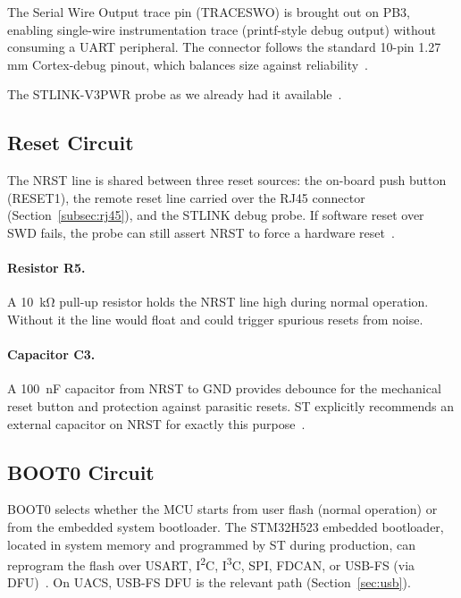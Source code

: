 The Serial Wire Output trace pin (TRACESWO) is brought out on PB3, enabling single-wire
instrumentation trace (printf-style debug output) without consuming a UART peripheral.
The connector follows the standard 10-pin 1.27\,mm Cortex-debug pinout, which balances
size against reliability~\cite{ref13}.

The STLINK-V3PWR probe as we already had it available~\cite{ref4}.

\subsection{Reset Circuit}
\label{subsec:reset}

The NRST line is shared between three reset sources: the on-board push button (RESET1),
the remote reset line carried over the RJ45 connector
(Section~\ref{subsec:rj45}), and the STLINK debug probe. If software reset over SWD fails, the probe can still assert NRST to force a hardware reset~\cite{ref13}.

\paragraph{Resistor R5.}
A \SI{10}{\kilo\ohm} pull-up resistor holds the NRST line high during normal operation.
Without it the line would float and could trigger spurious resets from noise.

\paragraph{Capacitor C3.}
A \SI{100}{\nano\farad} capacitor from NRST to GND provides debounce for the mechanical
reset button and protection against parasitic resets. ST explicitly recommends an external
capacitor on NRST for exactly this purpose~\cite{ref1}.

\subsection{BOOT0 Circuit}
\label{subsec:boot0}

BOOT0 selects whether the MCU starts from user flash (normal operation) or from the
embedded system bootloader. The STM32H523 embedded bootloader, located in system memory
and programmed by ST during production, can reprogram the flash over USART, I\textsuperscript{2}C,
I\textsuperscript{3}C, SPI, FDCAN, or USB-FS (via DFU)~\cite{ref1}. On UACS, USB-FS DFU
is the relevant path (Section~\ref{sec:usb}).

